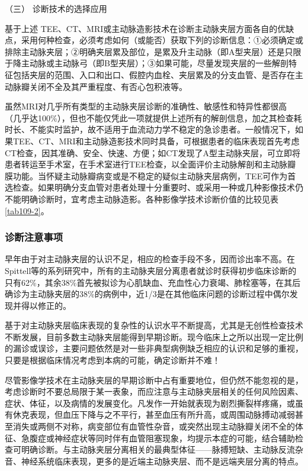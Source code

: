 \hypertarget{text00314.htmlux5cux23CHP10-9-2-2-3}{}
（三） 诊断技术的选择应用

基于上述
TEE、CT、MRI或主动脉造影技术在诊断主动脉夹层方面各自的优缺点，采用何种检查，必须考虑如何（或能否）获取下列的诊断信息：①必须确定或排除主动脉夹层；②明确夹层累及部位，是累及升主动脉（即A型夹层）还是只限于降主动脉或主动脉弓（即B型夹层）；③如果可能，尽量发现夹层的一些解剖特征包括夹层的范围、入口和出口、假腔内血栓、夹层累及的分支血管、是否存在主动脉瓣关闭不全及其严重程度、有否心包积液等。

虽然MRI对几乎所有类型的主动脉夹层诊断的准确性、敏感性和特异性都很高（几乎达100\%），但也不能仅凭此一项就提供上述所有的解剖信息，加之其检查耗时长、不能实时监护，故不适用于血流动力学不稳定的急诊患者。一般情况下，如果TEE、CT、MRI和主动脉造影技术同时具备，可根据患者的临床表现首先考虑CT检查，因其准确、安全、快速、方便；如CT发现了A型主动脉夹层，可立即将患者转运至手术室，在手术室进行TEE检查，以全面评价主动脉解剖和主动脉瓣膜功能。当怀疑主动脉瓣病变或是不稳定的疑似主动脉夹层病例，TEE可作为首选检查。如果明确分支血管对患者处理十分重要时、或采用一种或几种影像技术仍不能明确诊断时，宜考虑主动脉造影。各种影像学技术诊断价值的比较见表\ref{tab109-2}。

\subsubsection{诊断注意事项}

早年由于对主动脉夹层的认识不足，相应的检查手段不多，因而诊出率不高。在Spittell等的系列研究中，所有的主动脉夹层分离患者就诊时获得初步临床诊断的只有62\%，其余38\%首先被拟诊为心肌缺血、充血性心力衰竭、肺栓塞等，在其后确诊为主动脉夹层的38\%的病例中，近1/3是在其他临床问题的诊断过程中偶尔发现并得以修正的。

基于对主动脉夹层临床表现的复杂性的认识水平不断提高，尤其是无创性检查技术不断发展，目前多数主动脉夹层能得到早期诊断。现今临床上之所以出现一定比例的漏诊或误诊，主要问题依然是对一些非典型病例缺乏相应的认识和足够的重视，只要是根据临床情况考虑到本病的可能，确定诊断并不难！

尽管影像学技术在主动脉夹层的早期诊断中占有重要地位，但仍然不能忽视的是，考虑诊断时不要总局限于某一表象，而应注意与主动脉夹层相关的任何风险因素、症状、体征，以及病情的发展变化。凡发作一开始就表现为剧烈撕裂样疼痛，或虽有休克表现，但血压下降与之不平行，甚至血压有所升高，或周围动脉搏动减弱甚至消失或两侧不对称，病变部位有血管性杂音，或突然出现主动脉瓣关闭不全的体征、急腹症或神经症状等同时伴有血管阻塞现象，均提示本症的可能，结合辅助检查可明确诊断。与主动脉夹层分离相关的最典型体征------脉搏短缺、主动脉反流杂音、神经系统临床表现，更多的是近端主动脉夹层、而不是远端夹层分离的特点。

